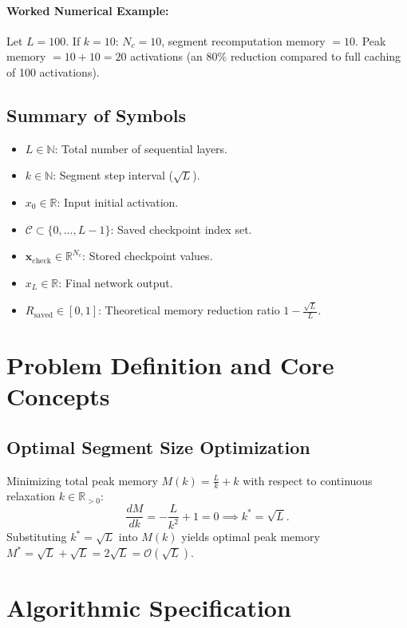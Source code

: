 \documentclass[11pt]{article}
\begin{document}
\paragraph{Worked Numerical Example:}
Let $L = 100$.
If $k = 10$: $N_c = 10$, segment recomputation memory $= 10$. Peak memory $= 10 + 10 = 20$ activations (an $80\%$ reduction compared to full caching of 100 activations).

\subsection{Summary of Symbols}
\begin{itemize}
    \item $L \in \mathbb{N}$: Total number of sequential layers.
    \item $k \in \mathbb{N}$: Segment step interval ($\sqrt{L}$).
    \item $x_0 \in \mathbb{R}$: Input initial activation.
    \item $\mathcal{C} \subset \{0, \dots, L-1\}$: Saved checkpoint index set.
    \item $\mathbf{x}_{\mathrm{check}} \in \mathbb{R}^{N_c}$: Stored checkpoint values.
    \item $x_L \in \mathbb{R}$: Final network output.
    \item $R_{\mathrm{saved}} \in [0, 1]$: Theoretical memory reduction ratio $1 - \frac{\sqrt{L}}{L}$.
\end{itemize}

\section{Problem Definition and Core Concepts}
\label{sec:problem_definition}

\subsection{Optimal Segment Size Optimization}
Minimizing total peak memory $M(k) = \frac{L}{k} + k$ with respect to continuous relaxation $k \in \mathbb{R}_{>0}$:
\begin{equation}
\frac{d M}{d k} = -\frac{L}{k^2} + 1 = 0 \implies k^* = \sqrt{L}.
\end{equation}
Substituting $k^* = \sqrt{L}$ into $M(k)$ yields optimal peak memory $M^* = \sqrt{L} + \sqrt{L} = 2\sqrt{L} = \mathcal{O}(\sqrt{L})$.

\section{Algorithmic Specification}
\label{sec:algorithm}
\end{document}
